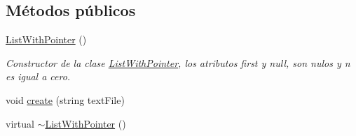 \subsection*{Métodos públicos}
\begin{DoxyCompactItemize}
\item 
\hypertarget{class_list_with_pointer_a53b1284b13bf834bc5fc1eb27368a283}{\hyperlink{class_list_with_pointer_a53b1284b13bf834bc5fc1eb27368a283}{List\-With\-Pointer} ()}\label{class_list_with_pointer_a53b1284b13bf834bc5fc1eb27368a283}

\begin{DoxyCompactList}\small\item\em Constructor de la clase \hyperlink{class_list_with_pointer}{List\-With\-Pointer}, los atributos first y null, son nulos y n es igual a cero. \end{DoxyCompactList}\item 
void \hyperlink{class_list_with_pointer_a44ca7acf19c6c4d3af4dde8438dacd93}{create} (string text\-File)
\item 
\hypertarget{class_list_with_pointer_ac0567286c62e3521fa5130f95010e779}{virtual \hyperlink{class_list_with_pointer_ac0567286c62e3521fa5130f95010e779}{$\sim$\-List\-With\-Pointer} ()}\label{class_list_with_pointer_ac0567286c62e3521fa5130f95010e779}


\end{DoxyCompactItemize}
